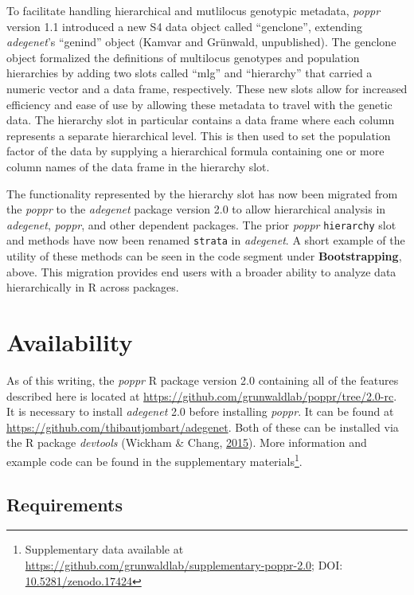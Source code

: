\documentclass[double,11pt]{beavtex}
\begin{document}
  To facilitate handling hierarchical and mutlilocus genotypic metadata,
  \emph{poppr} version 1.1 introduced a new S4 data object called
  ``genclone'', extending \emph{adegenet}'s ``genind'' object (Kamvar and
  Grünwald, unpublished). The genclone object formalized the definitions
  of multilocus genotypes and population hierarchies by adding two slots
  called ``mlg'' and ``hierarchy'' that carried a numeric vector and a
  data frame, respectively. These new slots allow for increased efficiency
  and ease of use by allowing these metadata to travel with the genetic
  data. The hierarchy slot in particular contains a data frame where each
  column represents a separate hierarchical level. This is then used to
  set the population factor of the data by supplying a hierarchical
  formula containing one or more column names of the data frame in the
  hierarchy slot.
  
  The functionality represented by the hierarchy slot has now been
  migrated from the \emph{poppr} to the \emph{adegenet} package version
  2.0 to allow hierarchical analysis in \emph{adegenet}, \emph{poppr}, and
  other dependent packages. The prior \emph{poppr} \texttt{hierarchy} slot
  and methods have now been renamed \texttt{strata} in \emph{adegenet}. A
  short example of the utility of these methods can be seen in the code
  segment under \textbf{Bootstrapping}, above. This migration provides end
  users with a broader ability to analyze data hierarchically in R across
  packages.
  
  \section{Availability}\label{availability}
  
  As of this writing, the \emph{poppr} R package version 2.0 containing
  all of the features described here is located at
  \url{https://github.com/grunwaldlab/poppr/tree/2.0-rc}. It is necessary
  to install \emph{adegenet} 2.0 before installing \emph{poppr}. It can be
  found at \url{https://github.com/thibautjombart/adegenet}. Both of these
  can be installed via the R package \emph{devtools} (Wickham \& Chang,
  \protect\hyperlink{ref-wickham2015devtools}{2015}). More information and
  example code can be found in the supplementary materials\footnote{Supplementary
    data available at
    \url{https://github.com/grunwaldlab/supplementary-poppr-2.0}; DOI:
    \href{http://dx.doi.org/10.5281/zenodo.17424}{10.5281/zenodo.17424}}.
  
  \subsection{Requirements}\label{requirements}
  
\end{document}
